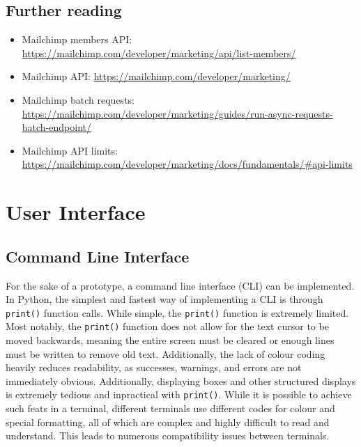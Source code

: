 \documentclass[11pt]{article}
\begin{document}
\inputminted[linenos=true]{python}{mailchimp_examples/add_or_update_member.py}

\subsection{Further reading}

\begin{itemize}
    \item Mailchimp members API: \url{https://mailchimp.com/developer/marketing/api/list-members/}
    \item Mailchimp API: \url{https://mailchimp.com/developer/marketing/}
    \item Mailchimp batch requests: \url{https://mailchimp.com/developer/marketing/guides/run-async-requests-batch-endpoint/}
    \item Mailchimp API limits: \url{https://mailchimp.com/developer/marketing/docs/fundamentals/#api-limits}
\end{itemize}

\newpage

\section{User Interface}

\subsection{Command Line Interface}

For the sake of a prototype, a command line interface (CLI) can be implemented. In Python, the simplest and fastest way of implementing a CLI is through \texttt{print()} function calls. While simple, the \texttt{print()} function is extremely limited. Most notably, the \texttt{print()} function does not allow for the text cursor to be moved backwards, meaning the entire screen must be cleared or enough lines must be written to remove old text. Additionally, the lack of colour coding heavily reduces readability, as successes, warnings, and errors are not immediately obvious. Additionally, displaying boxes and other structured displays is extremely tedious and inpractical with \texttt{print()}. While it is possible to achieve such feats in a terminal, different terminals use different codes for colour and special formatting, all of which are complex and highly difficult to read and understand. This leads to numerous compatibility issues between terminals.
\end{document}
